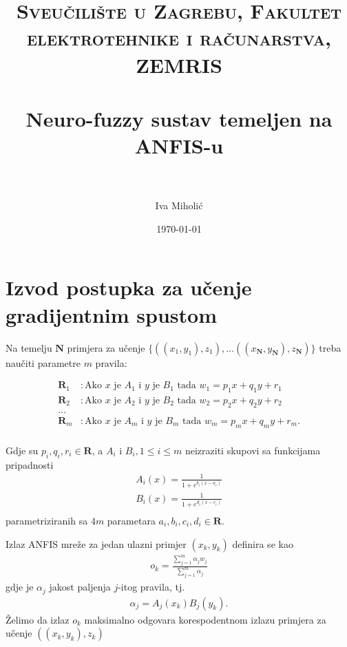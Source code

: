 \documentclass[paper=a4, fontsize=11pt]{scrartcl} %
\title{	
\normalfont \normalsize 
\textsc{Sveučilište u Zagrebu, Fakultet elektrotehnike i računarstva, ZEMRIS} \\ [25pt] %
\horrule{0.5pt} \\[0.4cm] %
\huge Neuro-fuzzy sustav temeljen na ANFIS-u \\ %
\horrule{2pt} \\[0.5cm] %
}
\author{Iva Miholić} %
\date{\normalsize\today} %
\numberwithin{equation}{section} %
\numberwithin{figure}{section} %
\numberwithin{table}{section} %
\begin{document}
\maketitle %

\section{Izvod postupka za učenje gradijentnim spustom}

Na temelju $\mathbf{N}$ primjera za učenje $\{((x_1, y_1), z_1), \dots ((x_\mathbf{N},y_\mathbf{N}), z_\mathbf{N})\}$ treba naučiti parametre $m$ pravila:

\begin{align*}
\mathbf{R}_1 &: \text{Ako }  x \text{ je } A_1 \text{ i } y \text{ je } B_1 \text{ tada } w_1 = p_1 x + q_1 y + r_1 \\
\mathbf{R}_2 &: \text{Ako }  x \text{ je } A_2 \text{ i } y \text{ je } B_2 \text{ tada } w_2 = p_2 x + q_2 y + r_2 \\
\dots& \\
\mathbf{R}_m &: \text{Ako }  x \text{ je } A_m \text{ i } y \text{ je } B_m \text{ tada } w_m = p_m x + q_m y + r_m. \\
\end{align*}

Gdje su $p_i, q_i, r_i \in \mathbf{R}$, a $A_i$ i $B_i, 1 \leq i \leq m$ neizraziti skupovi  sa funkcijama pripadnosti
\begin{align*}
A_i(x) = \frac{1}{1 + e ^ {b_i(x - a_i)}} \\
B_i(x) = \frac{1}{1 + e ^ {d_i(x - c_i)}} \\
\end{align*} parametriziranih sa  $4m$ parametara $a_i, b_i, c_i, d_i \in \mathbf{R}$.

Izlaz ANFIS mreže za jedan ulazni primjer $(x_k, y_k)$ definira se kao 
\begin{align*}
o_k = \frac{\sum_{j = 1}^{m} \alpha_j w_j}{\sum_{j = 1}^{m} \alpha_j} 
\end{align*}
gdje je $\alpha_j$ jakost paljenja $j$-itog pravila, tj.
\begin{align*}
\alpha_j = A_j(x_k) B_j(y_k).
\end{align*}
Želimo da izlaz $o_k$ maksimalno odgovara korespodentnom izlazu primjera za učenje $((x_k, y_k), z_k)$
\end{document}
